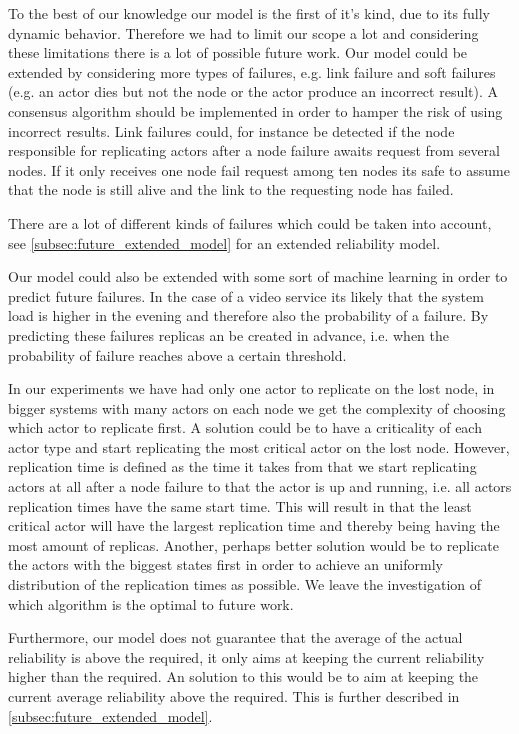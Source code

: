 \documentclass{cslthse-msc}
\begin{document}
To the best of our knowledge our model is the first of it's kind, due to its fully dynamic behavior. Therefore we had to limit our scope a lot and considering these limitations there is a lot of possible future work. Our model could be extended by considering more types of failures, e.g. link failure and soft failures (e.g. an actor dies but not the node or the actor produce an incorrect result). A consensus algorithm should be implemented in order to hamper the risk of using incorrect results. Link failures could, for instance be detected if the node responsible for replicating actors after a node failure awaits request from several nodes. If it only receives one node fail request among ten nodes its safe to assume that the node is still alive and the link to the requesting node has failed.

There are a lot of different kinds of failures which could be taken into account, see \cref{subsec:future_extended_model} for an extended reliability model.

Our model could also be extended with some sort of machine learning in order to predict future failures. In the case of a video service its likely that the system load is higher in the evening and therefore also the probability of a failure. By predicting these failures replicas an be created in advance, i.e. when the probability of failure reaches above a certain threshold.

In our experiments we have had only one actor to replicate on the lost node, in bigger systems with many actors on each node we get the complexity of choosing which actor to replicate first. A solution could be to have a criticality of each actor type and start replicating the most critical actor on the lost node. However, replication time is defined as the time it takes from that we start replicating actors at all after a node failure to that the actor is up and running, i.e. all actors replication times have the same start time. This will result in that the least critical actor will have the largest replication time and thereby being having the most amount of replicas. 
Another, perhaps better solution would be to replicate the actors with the biggest states first in order to achieve an uniformly distribution of the replication times as possible. We leave the investigation of which algorithm is the optimal to future work.

Furthermore, our model does not guarantee that the average of the actual reliability is above the required, it only aims at keeping the current reliability higher than the required. An solution to this would be to aim at keeping the current average reliability above the required. This is further described in \cref{subsec:future_extended_model}. 
\end{document}
